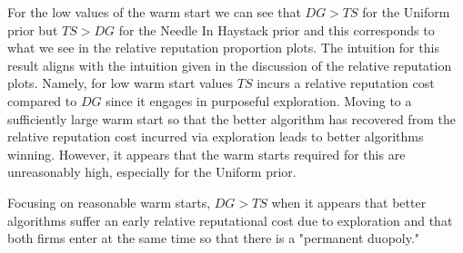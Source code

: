 \documentclass{article}
\theoremstyle{definition}
\begin{document}
For the low values of the warm start we can see that $DG > TS$ for the Uniform prior but $TS > DG$ for the Needle In Haystack prior and this corresponds to what we see in the relative reputation proportion plots. The intuition for this result aligns with the intuition given in the discussion of the relative reputation plots. Namely, for low warm start values $TS$ incurs a relative reputation cost compared to $DG$ since it engages in purposeful exploration. Moving to a sufficiently large warm start so that the better algorithm has recovered from the relative reputation cost incurred via exploration leads to better algorithms winning. However, it appears that the warm starts required for this are unreasonably high, especially for the Uniform prior.

Focusing on reasonable warm starts, $DG > TS$ when it appears that better algorithms suffer an early relative reputational cost due to exploration and that both firms enter at the same time so that there is a "permanent duopoly."
\end{document}
